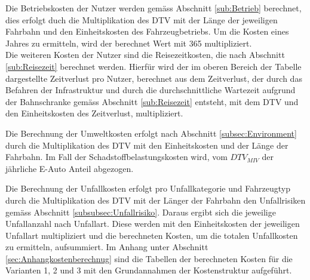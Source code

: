 Die Betriebskosten der Nutzer werden gemäss Abschnitt \ref{sub:Betrieb} berechnet, dies erfolgt duch die Multiplikation des DTV mit der Länge der jeweiligen Fahrbahn und den Einheitskosten des Fahrzeugbetriebs. Um die Kosten eines Jahres zu ermitteln, wird der berechnet Wert mit 365 multipliziert. \\
Die weiteren Kosten der Nutzer sind die Reisezeitkosten, die nach Abschnitt \ref{sub:Reisezeit} berechnet werden. Hierfür wird der im oberen Bereich der Tabelle dargestellte Zeitverlust pro Nutzer, berechnet aus dem Zeitverlust, der durch das Befahren der Infrastruktur und durch die durchschnittliche Wartezeit aufgrund der Bahnschranke gemäss Abschnitt \ref{sub:Reisezeit} entsteht, mit dem DTV und den Einheitskosten des Zeitverlust, multipliziert.

Die Berechnung der Umweltkosten erfolgt nach Abschnitt \ref{subsec:Environment} durch die Multiplikation des DTV mit den Einheitskosten und der Länge der Fahrbahn. Im Fall der Schadstoffbelastungskosten wird, vom $DTV_{MIV}$ der jährliche E-Auto Anteil abgezogen.

Die Berechnung der Unfallkosten erfolgt pro Unfallkategorie und Fahrzeugtyp durch die Multiplikation des DTV mit der Länger der Fahrbahn den Unfallrisiken gemäss Abschnitt \ref{subsubsec:Unfallrisiko}. Daraus ergibt sich die jeweilige Unfallanzahl nach Unfallart. Diese werden mit den Einheitskosten der jeweiligen Unfallart multipliziert und die berechneten Kosten, um die totalen Unfallkosten zu ermitteln, aufsummiert. Im Anhang unter Abschnitt \ref{sec:Anhangkostenberechnug} sind die Tabellen der berechneten Kosten für die Varianten 1, 2 und 3 mit den Grundannahmen der Kostenstruktur aufgeführt.



%

